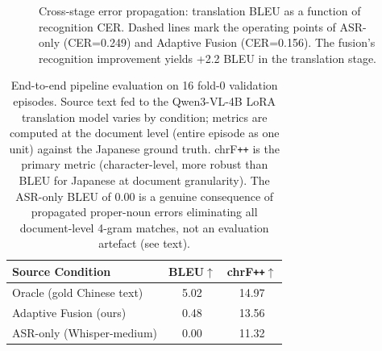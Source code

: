 \documentclass[journal]{IEEEtran}
\begin{document}
\begin{figure}[t]
\centering
{}
\caption{Cross-stage error propagation: translation BLEU as a function of recognition CER. Dashed lines mark the operating points of ASR-only (CER=0.249) and Adaptive Fusion (CER=0.156). The fusion's recognition improvement yields +2.2 BLEU in the translation stage.}
\label{fig:error_prop}
\end{figure}

\begin{table}[t]
\caption{End-to-end pipeline evaluation on 16 fold-0 validation episodes. Source text fed to the Qwen3-VL-4B LoRA translation model varies by condition; metrics are computed at the document level (entire episode as one unit) against the Japanese ground truth. chrF\texttt{++} is the primary metric (character-level, more robust than BLEU for Japanese at document granularity). The ASR-only BLEU of 0.00 is a genuine consequence of propagated proper-noun errors eliminating all document-level 4-gram matches, not an evaluation artefact (see text).}
\label{tab:e2e}
\centering
\begin{tabular}{lcc}
\toprule
\textbf{Source Condition} & \textbf{BLEU}$\uparrow$ & \textbf{chrF\texttt{++}}$\uparrow$ \\
\midrule
Oracle (gold Chinese text)   & 5.02 & 14.97 \\
Adaptive Fusion (ours)       & 0.48 & 13.56 \\
ASR-only (Whisper-medium)    & 0.00 & 11.32 \\
\bottomrule
\end{tabular}
\end{table}

\begin{table}[t]
\centering
\caption{Translation quality ablation: visual context vs.\ text-only input using Qwen3-VL zero-shot on 20 episodes. Absolute BLEU gain: +3.35.}
\label{tab:ablation_context}
\end{table}
\end{document}
